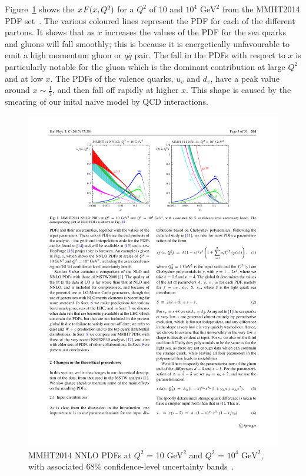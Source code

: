 Figure~\ref{fig:theo-qcd_pdf} shows the $x\hspace{0.3mm}F(x,Q^2)$ for a $Q^2$ of 10 and $10^4$ $\text{GeV}^2$
from the MMHT2014 PDF set~\cite{theo-qcd_pdf}.
The various coloured lines represent the PDF for each of the different partons.
It shows that as $x$ increases the values of the PDF for the sea quarks and gluons will fall smoothly;
this is because it is energetically unfavourable to emit a high momentum gluon or $q\bar{q}$ pair.
The fall in the PDFs with respect to $x$ is particularly notable for the gluon which is the dominant contribution at large $Q^2$ and at low $x$.
The PDFs of the valence quarks, $u_v$ and $d_v$, have a peak value around $x \sim \frac{1}{3}$, and then fall off rapidly at higher $x$.
This shape is caused by the smearing of our inital naive model by QCD interactions.

\begin{figure}[!bt]
  \begin{center}
    \includegraphics[width=1\linewidth, angle=0]{figs/Theory/qcd_pdf.pdf}
  \end{center}
  \caption[MMHT2014 NNLO PDFs at $Q^2$ = 10 $\text{GeV}^2$ and $Q^2$ = $10^4$ $\text{GeV}^2$, with associated 68\% confidence-level uncertainty bands.]
  {MMHT2014 NNLO PDFs at $Q^2$ = 10 $\text{GeV}^2$ and $Q^2$ = $10^4$ $\text{GeV}^2$, with associated 68\% confidence-level uncertainty bands~\cite{theo-qcd_pdf}.}
  \label{fig:theo-qcd_pdf}
\end{figure}


